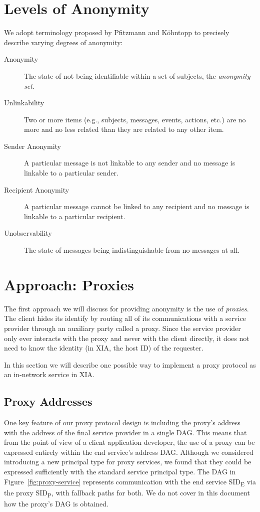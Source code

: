\documentclass[11pt]{article}
\begin{document}
\section{Levels of Anonymity}
We adopt terminology proposed by Pfitzmann and K\"{o}hntopp to precisely describe varying degrees of anonymity:
\begin{description}
\item[Anonymity] The state of not being identifiable within a set of subjects, the {\em anonymity set}.
\item[Unlinkability] Two or more items (e.g., subjects, messages, events, actions, etc.) are no more and no less related than they are related to any other item.
\item[Sender Anonymity] A particular message is not linkable to any sender and no message is linkable to a particular sender.
\item[Recipient Anonymity] A particular message cannot be linked to any recipient and no message is linkable to a particular recipient.
\item[Unobservability] The state of messages being indistinguishable from no messages at all.
\end{description}

\section{Approach: Proxies}
The first approach we will discuss for providing anonymity is the use of {\em proxies}.  The client hides its identify by routing all of its communications with a service provider through an auxiliary party called a proxy.  Since the service provider only ever interacts with the proxy and never with the client directly, it does not need to know the identity (in XIA, the host ID) of the requester.

In this section we will describe one possible way to implement a proxy protocol as an in-network service in XIA.  

\subsection{Proxy Addresses}

One key feature of our proxy protocol design is including the proxy's address with the address of the final service provider in a single DAG.  This means that from the point of view of a client application developer, the use of a proxy can be expressed entirely within the end service's address DAG. Although we considered introducing a new principal type for proxy services, we found that they could be expressed sufficiently with the standard service principal type.  The DAG in Figure~\ref{fig:proxy-service} represents communication with the end service SID\textsubscript{E} via the proxy SID\textsubscript{P}, with fallback paths for both.  We do not cover in this document how the proxy's DAG is obtained.
\end{document}

